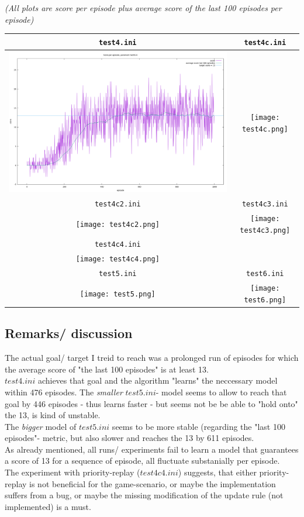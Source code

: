 \documentclass{article}
\begin{document}
\textit{(All plots are score per episode plus average score of the last 100 episodes per episode)}
\\
\begin{tabular}{ |c|c| }
  \hline
  \texttt{test4.ini} & \texttt{test4c.ini} \\
  \hline
  \includegraphics[scale=0.12]{test4.png} & \texttt{[image: test4c.png]} \\
  \hline
  \texttt{test4c2.ini} & \texttt{test4c3.ini} \\
  \hline
  \texttt{[image: test4c2.png]} & \texttt{[image: test4c3.png]} \\
  \hline
  \texttt{test4c4.ini} &  \\
  \hline
  \texttt{[image: test4c4.png]} &  \\
  \hline
  \texttt{test5.ini} & \texttt{test6.ini} \\
  \hline
  \texttt{[image: test5.png]} & \texttt{[image: test6.png]} \\
  \hline
\end{tabular}

\subsection{Remarks/ discussion}
The actual goal/ target I treid to reach was a prolonged run of episodes
for which the average score of "the last 100 episodes" is at least 13.
\\
$test4.ini$ achieves that goal and the algorithm "learns" the neccessary model
within 476 episodes. The \textit{smaller} $test5.ini$- model seems to allow
to reach that goal by 446 episodes - thus learns faster - but seems not be be
able to "hold onto" the 13, is kind of unstable.\\
The \textit{bigger} model of $test5.ini$ seems to be more stable (regarding the
"last 100 episodes"- metric, but also slower and reaches the 13 by 611 episodes.\\
As already mentioned, all runs/ experiments fail to learn a model that guarantees
a score of 13 for a sequence of episode, all fluctuate substanially per episode.
\\
The experiment with priority-replay ($test4c4.ini$) suggests, that either priority-replay
is not beneficial for the game-scenario, or maybe the implementation suffers from a bug,
or maybe the missing modification of the update rule (not implemented) is a must.
\end{document}

